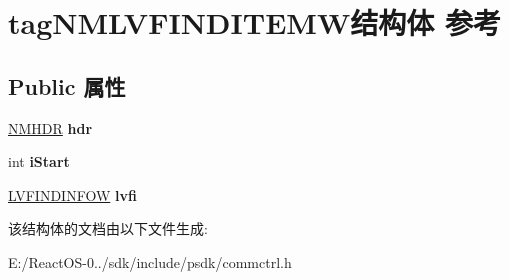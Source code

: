 \hypertarget{structtag_n_m_l_v_f_i_n_d_i_t_e_m_w}{}\section{tag\+N\+M\+L\+V\+F\+I\+N\+D\+I\+T\+E\+M\+W结构体 参考}
\label{structtag_n_m_l_v_f_i_n_d_i_t_e_m_w}
\subsection*{Public 属性}
\begin{DoxyCompactItemize}
\item 
\mbox{\label{structtag_n_m_l_v_f_i_n_d_i_t_e_m_w_a243fff584287eaab6832cb3046eee9f5}} 
\hyperlink{structtag_n_m_h_d_r}{N\+M\+H\+DR} {\bfseries hdr}
\item 
\mbox{\label{structtag_n_m_l_v_f_i_n_d_i_t_e_m_w_ab7bbb40001e599b84529d9a6842d50c1}} 
int {\bfseries i\+Start}
\item 
\mbox{\label{structtag_n_m_l_v_f_i_n_d_i_t_e_m_w_aba3a8077a55b7694f2bb19c7a917f7e4}} 
\hyperlink{structtag_l_v_f_i_n_d_i_n_f_o_w}{L\+V\+F\+I\+N\+D\+I\+N\+F\+OW} {\bfseries lvfi}
\end{DoxyCompactItemize}


该结构体的文档由以下文件生成\+:\begin{DoxyCompactItemize}
\item 
E\+:/\+React\+O\+S-\/0../sdk/include/psdk/commctrl.\+h\end{DoxyCompactItemize}
